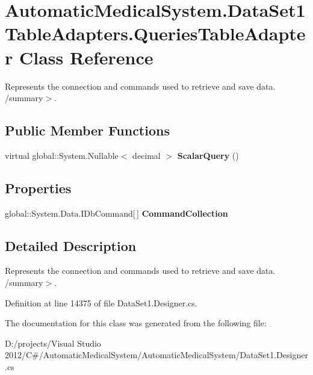 \section{AutomaticMedicalSystem.DataSet1TableAdapters.QueriesTableAdapter Class Reference}
\label{class_automatic_medical_system_1_1_data_set1_table_adapters_1_1_queries_table_adapter}
Represents the connection and commands used to retrieve and save data. /summary$>$.  


\subsection*{Public Member Functions}
\begin{CompactItemize}
\item 
virtual global::System.Nullable$<$ decimal $>$ \textbf{ScalarQuery} ()\label{class_automatic_medical_system_1_1_data_set1_table_adapters_1_1_queries_table_adapter_0df8f011521d897c7f07c8fc19390612}

\end{CompactItemize}
\subsection*{Properties}
\begin{CompactItemize}
\item 
global::System.Data.IDbCommand[$\,$] \textbf{CommandCollection}\hspace{0.3cm}{\tt  [get]}\label{class_automatic_medical_system_1_1_data_set1_table_adapters_1_1_queries_table_adapter_44c673a3c2fcc38455c4cb6e10c5f390}

\end{CompactItemize}


\subsection{Detailed Description}
Represents the connection and commands used to retrieve and save data. /summary$>$. 

Definition at line 14375 of file DataSet1.Designer.cs.

The documentation for this class was generated from the following file:\begin{CompactItemize}
\item 
D:/projects/Visual Studio 2012/C\#/AutomaticMedicalSystem/AutomaticMedicalSystem/DataSet1.Designer.cs\end{CompactItemize}
